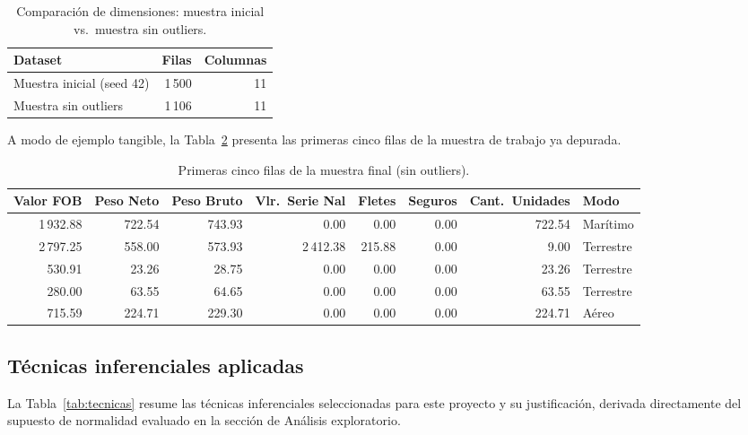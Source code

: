 \documentclass[12pt]{article}
\begin{document}
\begin{table}[htbp]
    \centering
    \caption{Comparación de dimensiones: muestra inicial vs.\ muestra sin outliers.}
    \label{tab:dimensiones}
    \begin{tabular}{lrr}
        \toprule
        Dataset & Filas & Columnas \\
        \midrule
        Muestra inicial (seed 42) & 1\,500 & 11 \\
        Muestra sin outliers & 1\,106 & 11 \\
        \bottomrule
    \end{tabular}
\end{table}
\FloatBarrier

A modo de ejemplo tangible, la Tabla~\ref{tab:muestra_head} presenta
las primeras cinco filas de la muestra de trabajo ya depurada.

\begin{table}[htbp]
    \centering
    \caption{Primeras cinco filas de la muestra final (sin outliers).}
    \label{tab:muestra_head}
    \footnotesize
    \setlength{\tabcolsep}{4pt}
    \begin{tabular}{rrrrrrrl}
        \toprule
        Valor FOB & Peso Neto & Peso Bruto & Vlr.\ Serie Nal & Fletes & Seguros & Cant.\ Unidades & Modo \\
        \midrule
        1\,932.88 & 722.54 & 743.93 & 0.00 & 0.00 & 0.00 & 722.54 & Marítimo \\
        2\,797.25 & 558.00 & 573.93 & 2\,412.38 & 215.88 & 0.00 & 9.00 & Terrestre \\
        530.91 & 23.26 & 28.75 & 0.00 & 0.00 & 0.00 & 23.26 & Terrestre \\
        280.00 & 63.55 & 64.65 & 0.00 & 0.00 & 0.00 & 63.55 & Terrestre \\
        715.59 & 224.71 & 229.30 & 0.00 & 0.00 & 0.00 & 224.71 & Aéreo \\
        \bottomrule
    \end{tabular}
\end{table}
\FloatBarrier

\subsection*{Técnicas inferenciales aplicadas}

La Tabla~\ref{tab:tecnicas} resume las técnicas inferenciales
seleccionadas para este proyecto y su justificación, derivada
directamente del supuesto de normalidad evaluado en la sección de
Análisis exploratorio.
\end{document}

